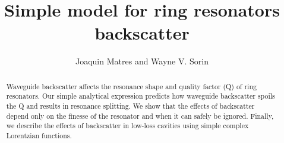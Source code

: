 \documentclass[10pt]{article}
\begin{document}
\title{Simple model for ring resonators backscatter}
\author{Joaquin Matres and Wayne V. Sorin}  
\address{Hewlett Packard Labs, 1501 Page Mill Road, Palo Alto, CA 94304, USA} 


\begin{abstract}
Waveguide backscatter affects the resonance shape and quality factor (Q) of ring resonators.
Our simple analytical expression predicts how waveguide backscatter spoils the Q and results in resonance splitting.
We show that the effects of backscatter depend only on the finesse of the resonator and when it can safely be ignored.
Finally, we describe the effects of backscatter in low-loss cavities using simple complex Lorentzian functions.
\end{abstract}

\end{document}
